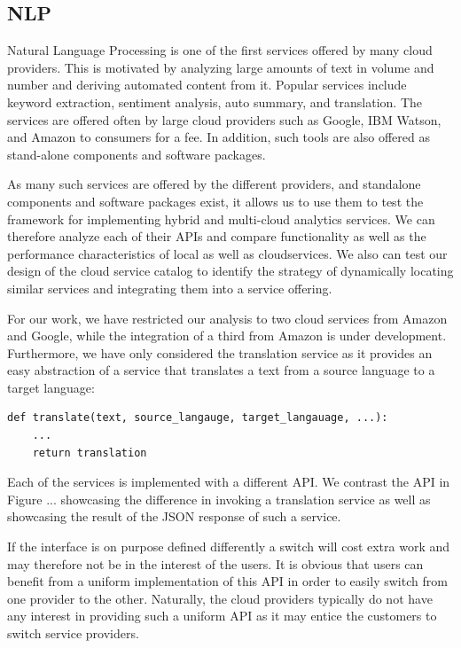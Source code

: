 
\subsection{NLP}


Natural Language Processing is one of the first services offered by
many cloud providers. This is motivated by analyzing large amounts of
text in volume and number and deriving automated content from
it. Popular services include keyword extraction, sentiment analysis,
auto summary, and translation.  The services are offered often by large
cloud providers such as Google, IBM Watson, and Amazon to consumers for
a fee. In addition, such tools are also offered as stand-alone
components and software packages.

As many such services are offered by the different providers, and
standalone components and software packages exist, it allows us to use
them to test the framework for implementing hybrid and multi-cloud
analytics services. We can therefore analyze each of their APIs and
compare functionality as well as the performance characteristics of
local as well as cloudservices. We also can test our design of the
cloud service catalog to identify the strategy of dynamically
locating similar services and integrating them into a service offering.

For our work, we have restricted our analysis to two cloud services
from Amazon and Google, while the integration of a third from Amazon
is under development. Furthermore, we have only considered the
translation service as it provides an easy abstraction of a service
that translates a text from a source language to a target language:

\smallskip
\begin{Verbatim}[fontsize=\small]
def translate(text, source_langauge, target_langauage, ...):
    ...
    return translation
\end{Verbatim}
\smallskip

Each of the services is implemented with a different API. We contrast
the API in Figure ... showcasing the difference in invoking a
translation service as well as showcasing the result of the JSON
response of such a service.


If the interface is on purpose defined differently a switch will cost
extra work and may therefore not be in the interest of the users.  It
is obvious that users can benefit from a uniform implementation of
this API in order to easily switch from one provider to the other.
Naturally, the cloud providers typically do not have any interest in
providing such a uniform API as it may entice the customers to switch
service providers.

